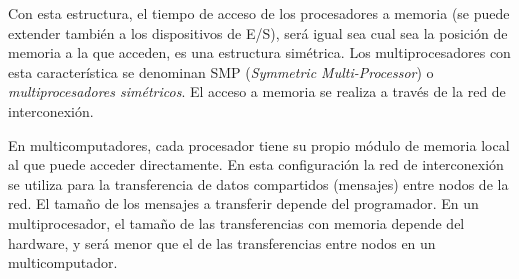 \documentclass[10pt,a4paper,spanish]{report}
\begin{document}
Con esta estructura, el tiempo de acceso de los procesadores a memoria (se puede extender también a los dispositivos de E/S), será igual sea cual sea la posición de memoria a la que acceden, es una estructura simétrica. Los multiprocesadores con esta característica se denominan SMP (\textit{\textcolor[rgb]{0.2,0.4,0.8}{Symmetric Multi-Processor}}) o \textit{\textcolor[rgb]{0.2,0.4,0.8}{multiprocesadores simétricos}}. El acceso a memoria se realiza a través de la red de interconexión.

En multicomputadores, cada procesador tiene su propio módulo de memoria local al que puede acceder directamente. En esta configuración la red de interconexión se utiliza para la transferencia de datos compartidos (mensajes) entre nodos de la red. El tamaño de los mensajes a transferir depende del programador. En un multiprocesador, el tamaño de las transferencias con memoria depende del hardware, y será menor que el de las transferencias entre nodos en un multicomputador. 
\end{document}
